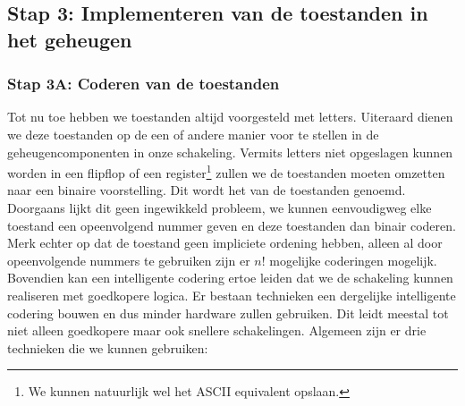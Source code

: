 \subsection{Stap 3: Implementeren van de toestanden in het geheugen}
\subsubsection{Stap 3A: Coderen van de toestanden}
\label{term:minimalBitChange}
\label{term:grayCodeCounter}
Tot nu toe hebben we toestanden altijd voorgesteld met letters. Uiteraard dienen we deze toestanden op de een of andere manier voor te stellen in de geheugencomponenten in onze schakeling. Vermits letters niet opgeslagen kunnen worden in een flipflop of een register\footnote{We kunnen natuurlijk wel het ASCII equivalent opslaan.} zullen we de toestanden moeten omzetten naar een binaire voorstelling. Dit wordt het  van de toestanden genoemd. Doorgaans lijkt dit geen ingewikkeld probleem, we kunnen eenvoudigweg elke toestand een opeenvolgend nummer geven en deze toestanden dan binair coderen. Merk echter op dat de toestand geen impliciete ordening hebben, alleen al door opeenvolgende nummers te gebruiken zijn er $n!$ mogelijke coderingen mogelijk. Bovendien kan een intelligente codering ertoe leiden dat we de schakeling kunnen realiseren met goedkopere logica. Er bestaan technieken een dergelijke intelligente codering bouwen en dus minder hardware zullen gebruiken. Dit leidt meestal tot niet alleen goedkopere maar ook snellere schakelingen. Algemeen zijn er drie technieken die we kunnen gebruiken:

